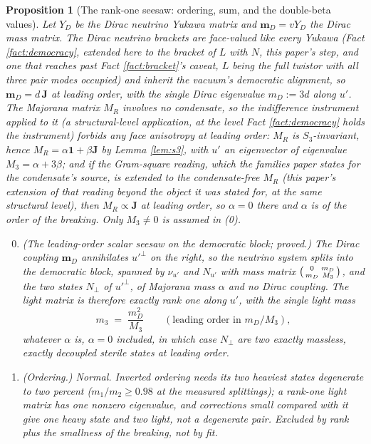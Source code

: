 \documentclass[11pt]{article}
\newtheorem{proposition}[theorem]{Proposition}
\theoremstyle{definition}
\newcommand{\J}{\mathbf{J}}
\newcommand{\mD}{\mathbf{m}_{D}}
\begin{document}
\begin{proposition}[The rank-one seesaw: ordering, sum, and the double-beta values]\label{prop:rankone}
Let $Y_{D}$ be the Dirac neutrino Yukawa matrix and $\mD = vY_{D}$ the Dirac mass matrix. The Dirac neutrino brackets are face-valued like every Yukawa (Fact \ref{fact:democracy}, extended here to the bracket of $L$ with $N$, this paper's step, and one that reaches past Fact \ref{fact:bracket}'s caveat, $L$ being the full twistor with all three pair modes occupied) and inherit the vacuum's democratic alignment, so $\mD = d\,\J$ at leading order, with the single Dirac eigenvalue $m_{D} := 3d$ along $u'$. The Majorana matrix $M_{R}$ involves no condensate, so the indifference instrument applied to it (a structural-level application, at the level Fact \ref{fact:democracy} holds the instrument) forbids any face anisotropy at leading order: $M_{R}$ is $S_{3}$-invariant, hence $M_{R} = \alpha\mathbf{1} + \beta\J$ by Lemma \ref{lem:s3}, with $u'$ an eigenvector of eigenvalue $M_{3} = \alpha + 3\beta$; and if the Gram-square reading, which the families paper states for the condensate's source, is extended to the condensate-free $M_{R}$ (this paper's extension of that reading beyond the object it was stated for, at the same structural level), then $M_{R} \propto \J$ at leading order, so $\alpha = 0$ there and $\alpha$ is of the order of the breaking. Only $M_{3} \neq 0$ is assumed in (0).
\begin{enumerate}
\setcounter{enumi}{-1}
\item \emph{(The leading-order scalar seesaw on the democratic block; proved.)} The Dirac coupling $\mD$ annihilates $u'^{\perp}$ on the right, so the neutrino system splits into the democratic block, spanned by $\nu_{u'}$ and $N_{u'}$ with mass matrix $\begin{psmallmatrix} 0 & m_{D} \\ m_{D} & M_{3}\end{psmallmatrix}$, and the two states $N_{\perp}$ of $u'^{\perp}$, of Majorana mass $\alpha$ and no Dirac coupling. The light matrix is therefore exactly rank one along $u'$, with the single light mass
\[
m_{3} \;=\; \frac{m_{D}^{2}}{M_{3}} \qquad(\text{leading order in } m_{D}/M_{3}),
\]
whatever $\alpha$ is, $\alpha = 0$ included, in which case $N_{\perp}$ are two exactly massless, exactly decoupled sterile states at leading order.
\item \emph{(Ordering.)} Normal. Inverted ordering needs its two heaviest states degenerate to two percent ($m_{1}/m_{2} \ge 0.98$ at the measured splittings); a rank-one light matrix has one nonzero eigenvalue, and corrections small compared with it give one heavy state and two light, not a degenerate pair. Excluded by rank plus the smallness of the breaking, not by fit.

\end{enumerate}
\end{proposition}
\end{document}
